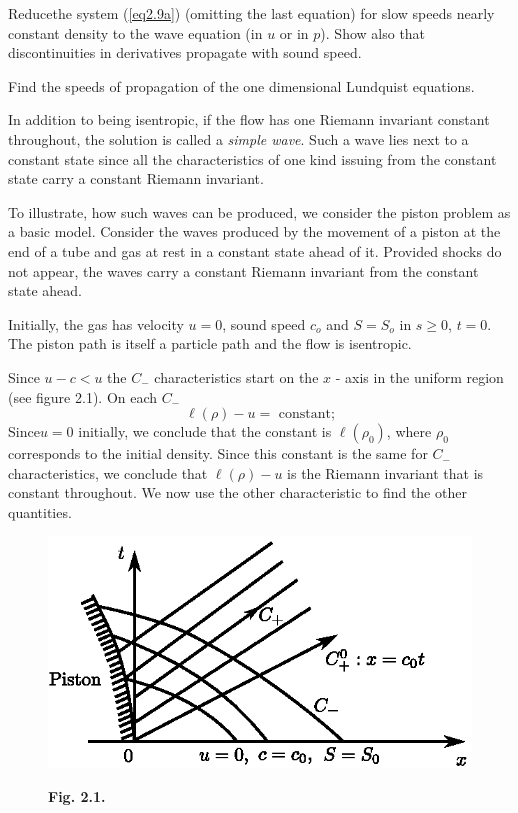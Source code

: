 \begin{exercise}\label{chap2:exer2.1}
Reduce\pageoriginale the system (\ref{eq2.9a}) (omitting the last equation) for slow speeds nearly constant  density to the wave equation (in $u$ or in $p$). Show also that discontinuities in derivatives propagate with sound speed.
\end{exercise}

\begin{exercise}\label{chap2:exer2.2}
Find the speeds of propagation of the one dimensional Lundquist equations.
\end{exercise}

\medskip
{}
In addition to being isentropic, if the flow has one Riemann invariant constant throughout, the solution is called a {\em simple wave}. Such a wave lies next to a constant state since all the characteristics of one kind issuing from the constant state carry a constant Riemann invariant. 

To illustrate, how such waves can be produced, we consider the piston problem as a basic model. Consider the waves produced by the movement of a piston at the end of a tube and gas at rest in a constant state ahead of it. Provided shocks do not appear, the waves carry a constant Riemann invariant from the constant state ahead.

Initially, the gas has velocity $u=0$, sound speed $c_o$ and $S= S_o$ in $s \geq 0$, $t=0$. The piston path is itself a particle path and the flow is isentropic.

Since $u- c< u$ the $C_-$ characteristics start on the $x$ - axis in the uniform region (see figure 2.1). On each $C_-$
\begin{equation*}
\ell (\rho) - u = \text{ constant;}\tag{2.10}\label{eq2.10}
\end{equation*}
Since\pageoriginale $u=0$ initially, we conclude that the constant is $\ell(\rho_0)$, where $\rho_0$ corresponds to the initial density. Since this constant is the same for $C_-$ characteristics, we conclude that $\ell(\rho) - u$ is the Riemann invariant that is constant throughout. We now use the other characteristic to find the other quantities. 
\begin{figure}[H]
\centering
\includegraphics{figures/fig2.1.eps}
\centerline{\bf Fig. 2.1.}
\end{figure}

